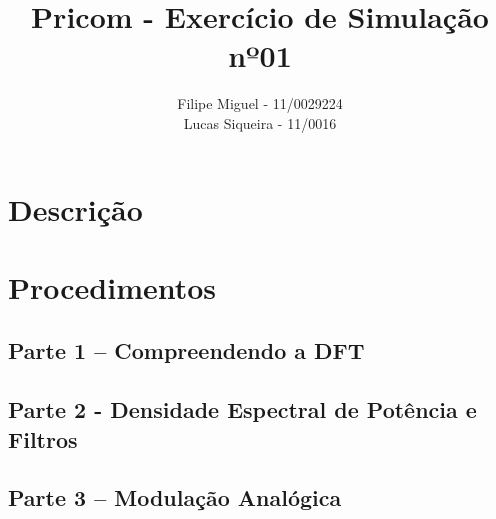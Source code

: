 \documentclass[a4paper]{article}
\title{Pricom - Exercício de Simulação nº01}
\author{Filipe Miguel - 11/0029224\\
	Lucas Siqueira - 11/0016}
\begin{document}
\maketitle


\section{Descrição}

\section{Procedimentos}
\subsection{Parte 1 – Compreendendo a DFT}
\subsection{Parte 2 - Densidade Espectral de Potência e Filtros}
\subsection{Parte 3 – Modulação Analógica}
\end{document}
